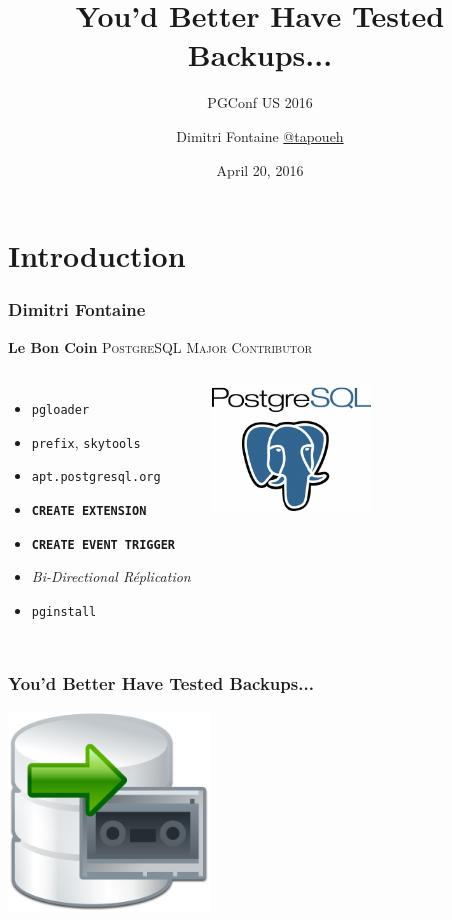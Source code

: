 \documentclass{beamer}
\title{You'd Better Have Tested Backups...}
\subtitle{PGConf US 2016}
\author{Dimitri Fontaine \url{@tapoueh}}
\date{April 20, 2016}
\begin{document}
\frame{\titlepage}

\section{Introduction}

\begin{frame}
  \frametitle{Dimitri Fontaine}

  \begin{center}
    \textbf{Le Bon Coin}
    \vfill
    {\Large \textsc{PostgreSQL Major Contributor}}
  \end{center}

\begin{columns}[c]

  \begin{itemize}
   \item \texttt{pgloader}
   \item \texttt{prefix}, \texttt{skytools}
   \item \texttt{apt.postgresql.org}
   \item \texttt{\textbf{CREATE EXTENSION}}
   \item \texttt{\textbf{CREATE EVENT TRIGGER}}
   \item \textit{Bi-Directional Réplication}
   \item \texttt{pginstall}
  \end{itemize}  

\begin{center}
  \includegraphics[height=9em]{postgres-logo.png}
\end{center}
\end{columns}
\end{frame}

\begin{frame}
  \frametitle{You'd Better Have Tested Backups...}

  \begin{center}
    \includegraphics[height=2.1in]{backup-review.png}
  \end{center}
\end{frame}
\end{document}
